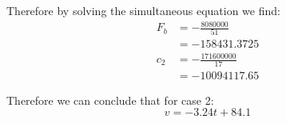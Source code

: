 Therefore by solving the simultaneous equation we find:
\begin{align*}
    F_b &= -\frac{8080000}{51}
    \\ &= -158431.3725
    \\ c_2 &= -\frac{171600000}{17}
    \\ &= -10094117.65
\end{align*}

Therefore we can conclude that for case 2:
\begin{equation}
    \boxed{v = -3.24t + 84.1}
\end{equation}

